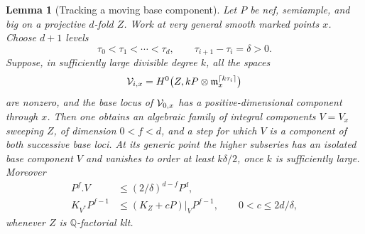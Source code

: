 \documentclass[11pt,letterpaper]{article}
\newtheorem{lemma}[theorem]{Lemma}
\theoremstyle{definition}
\theoremstyle{remark}
\begin{document}
\begin{lemma}[Tracking a moving base component]\label{proj:jet:tracking}
Let \(P\) be nef, semiample, and big on a projective \(d\)-fold \(Z\).
Work at very general smooth marked points \(x\).  Choose \(d+1\)
levels
\[
 \tau_0<\tau_1<\cdots<\tau_d,\qquad
 \tau_{i+1}-\tau_i=\delta>0.
\]
Suppose, in sufficiently large divisible degree \(k\), all the spaces
\[
 {\cal V}_{i,x}
 =H^0\bigl(Z,kP\otimes\mathfrak m_x^{\lceil k\tau_i\rceil}\bigr)
\]
are nonzero, and the base locus of \({\cal V}_{0,x}\) has a
positive-dimensional component through \(x\).
Then one obtains an algebraic family of integral components \(V=V_x\)
sweeping \(Z\), of dimension \(0<f<d\), and a step for which \(V\)
is a component of both successive base loci.  At its generic point
the higher subseries has an isolated base component \(V\) and
vanishes to order at least \(k\delta/2\), once \(k\) is sufficiently
large.  Moreover
\begin{equation}\label{proj:jet:tracking-estimates}
 \begin{split}
  P^f.V&\le (2/\delta)^{d-f}P^d,\\
  K_{V^*}P^{f-1}
   &\le (K_Z+cP)|_V P^{f-1},
       \qquad 0<c\le 2d/\delta,
 \end{split}
\end{equation}
whenever \(Z\) is \(\mathbb{Q}\)-factorial klt.
\end{lemma}
\end{document}
